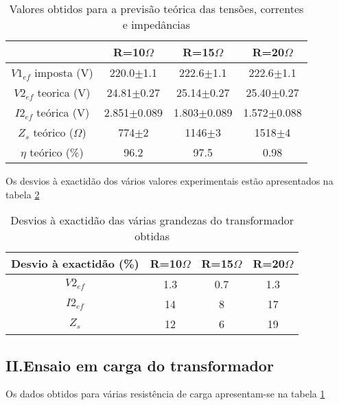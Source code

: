 \documentclass[%
  reprint,
  nofootinbib,
  amsmath,amssymb,
  aps,
  10pt,
]{revtex4-1}
\begin{document}
\begin{table}[h]
\begin{tabular}{c|c|c|c}
                         & R=10$\Omega$    & R=15$\Omega$    & R=20$\Omega$    \\ \hline
$V1_{ef}$ imposta (V)    & 220.0$\pm$1.1   & 222.6$\pm$1.1   & 222.6$\pm$1.1   \\ \hline
$V2_{ef}$ teorica (V)    & 24.81$\pm$0.27  & 25.14$\pm$0.27  & 25.40$\pm$0.27  \\ \hline
$I2_{ef}$ teórica (V)    & 2.851$\pm$0.089 & 1.803$\pm$0.089 & 1.572$\pm$0.088 \\ \hline
$Z_s$ teórico ($\Omega$) & 774$\pm$2       & 1146$\pm$3      & 1518$\pm$4     \\ \hline
$\eta$ teórico (\%) &96.2&97.5&0.98
\end{tabular}
\caption{Valores obtidos para a previsão teórica das tensões, correntes e impedâncias}
\label{tab:carga}
\end{table}
Os desvios à exactidão dos vários valores experimentais estão apresentados na tabela \ref{tab:exac}
\begin{table}[h]
\begin{tabular}{c|c|c|c}
Desvio à exactidão (\%) & R=10$\Omega$ & R=15$\Omega$ & R=20$\Omega$ \\ \hline
$V2_{ef}$               & 1.3          & 0.7          & 1.3          \\ \hline
$I2_{ef}$               & 14           & 8            & 17           \\ \hline
$Z_s$                   & 12           & 6            & 19          
\end{tabular}
\caption{Desvios à exactidão das várias grandezas do transformador obtidas}
\label{tab:exac}
\end{table}

\subsection*{II.Ensaio em carga do transformador}
Os dados obtidos para várias resistência de carga apresentam-se na tabela \ref{tab:carga}
\end{document}
